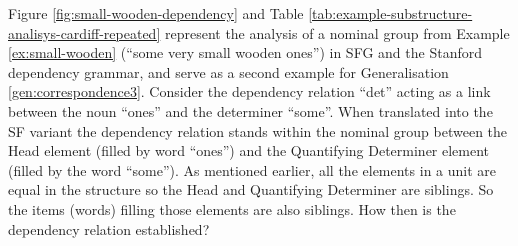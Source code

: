     Figure \ref{fig:small-wooden-dependency} and Table \ref{tab:example-substructure-analisys-cardiff-repeated} represent the analysis of a nominal group from Example \ref{ex:small-wooden} (``some very small wooden ones'') in SFG and the Stanford dependency grammar, and serve as a second example for Generalisation \ref{gen:correspondence3}. Consider the dependency relation ``det'' acting as a link between the noun ``ones'' and the determiner ``some''. When translated into the SF variant the dependency relation stands within the nominal group between the Head element (filled by word ``ones'') and the Quantifying Determiner element (filled by the word ``some''). As mentioned earlier, all the elements in a unit are equal in the structure so the Head and Quantifying Determiner are siblings. So the items (words) filling those elements are also siblings. How then is the dependency relation established? 




